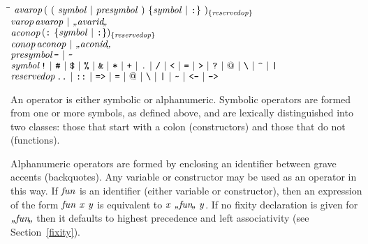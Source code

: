 \begin{flushleft}\it\begin{tabbing}
\hspace{0.5in}\=\hspace{3.0in}\=\kill
$\it avarop$\>\makebox[3.5em]{$\rightarrow$}$\it (\ (\ symbol\ |\ presymbol\ )\ \{symbol\ |\ \makebox{\tt :}\}\ )_{\{reservedop\}}$\\ 
$\it varop$\>\makebox[3.5em]{$\rightarrow$}$\it avarop\ |\ \bkqB{avarid}\bkqA$\\ 
$\it aconop$\>\makebox[3.5em]{$\rightarrow$}$\it (\makebox{\tt :}\ \{symbol\ |\ \makebox{\tt :}\})_{\{reservedop\}}$\\ 
$\it conop$\>\makebox[3.5em]{$\rightarrow$}$\it aconop\ |\ \bkqB{aconid}\bkqA$\\ 
$\it presymbol$\>\makebox[3.5em]{$\rightarrow$}$\it \makebox{\tt -}\ |\ \makebox{\tt {\char'176}}$\\ 
$\it symbol$\>\makebox[3.5em]{$\rightarrow$}$\it \makebox{\tt !}\ |\ \makebox{\tt {\char'43}}\ |\ \makebox{\tt {\char'44}}\ |\ \makebox{\tt {\char'45}}\ |\ \makebox{\tt {\char'46}}\ |\ \makebox{\tt *}\ |\ \makebox{\tt +}\ |\ \makebox{\tt .}\ |\ \makebox{\tt /}\ |\ \makebox{\tt <}\ |\ \makebox{\tt =}\ |\ \makebox{\tt >}\ |\ \makebox{\tt ?}\ |\ @\ |\ \makebox{\tt {\char'134}}\ |\ \makebox{\tt {\char'136}}\ |\ \makebox{\tt |}$\\ 
$\it reservedop$\>\makebox[3.5em]{$\rightarrow$}$\it \makebox{\tt ..}\ |\ \makebox{\tt ::}\ |\ \makebox{\tt =>}\ |\ \makebox{\tt =}\ |\ @\ |\ \makebox{\tt {\char'134}}\ |\ \makebox{\tt |}\ |\ \makebox{\tt {\char'176}}\ |\ \makebox{\tt <-}\ |\ \makebox{\tt ->}$
\end{tabbing}\end{flushleft}
%
%
%
%
%
%
%
An operator is either symbolic or alphanumeric.  Symbolic operators
are formed from one or more symbols, as defined above, and are
lexically distinguished into two classes: those that start with a
colon (constructors) and those that do not (functions).

Alphanumeric operators are formed by enclosing an identifier between
grave accents (backquotes).  Any variable or constructor may be used as
an operator in this way.  If \mbox{$\it fun$} is an identifier (either variable
or constructor), then an expression of the form \mbox{$\it fun\ x\ y$} is
equivalent to \mbox{$\it x\ \bkqB{fun}\bkqA\ y$}.  If no fixity
declaration is given for \mbox{$\it \bkqB{fun}\bkqA$} then it defaults
to highest precedence and left associativity
(see Section~\ref{fixity}).

